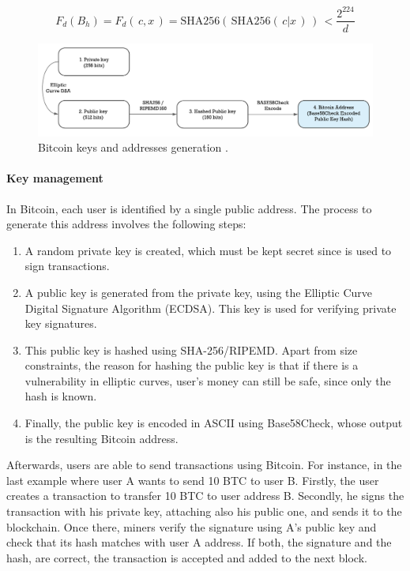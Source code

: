 \begin{equation} \label{eq:proofOfWork}
 F_d(B_h) = F_d( \,c,x \,) = \text{SHA256}( \, \text{SHA256}( \, c|x \,) \,)\, < \frac{2^{224}}{d}
\end{equation}

\begin{figure}[bth]
  \centering
  \includegraphics[width=0.9\linewidth]{gfx/bitkeys}    
  \caption{Bitcoin keys and addresses generation \citep{BitcoinKey2018}.}
  \label{fig:EthereumAccounts}
\end{figure}

\paragraph{Key management}

In Bitcoin, each user is identified by a single public address. The process to generate this address involves the following steps:

\begin{enumerate}
	
	\item A random private key is created, which must be kept secret since is used to sign transactions.
	\item A public key is generated from the private key, using the Elliptic Curve Digital Signature Algorithm \citep{johnson2001elliptic} (ECDSA). This key is used for verifying private key signatures.
	\item This public key is hashed using SHA-256/RIPEMD. Apart from size constraints, the reason for hashing the public key is that if there is a vulnerability in elliptic curves, user's money can still be safe, since only the hash is known.
	\item Finally, the public key is encoded in ASCII using Base58Check, whose output is the resulting Bitcoin address.
	
\end{enumerate}

Afterwards, users are able to send transactions using Bitcoin. For instance, in the last example where user A wants to send 10 BTC to user B. Firstly, the user creates a transaction to transfer 10 BTC to user address B. Secondly, he signs the transaction with his private key, attaching also his public one, and sends it to the blockchain. Once there, miners verify the signature using A's public key and check that its hash matches with user A address. If both, the signature and the hash, are correct, the transaction is accepted and added to the next block.


